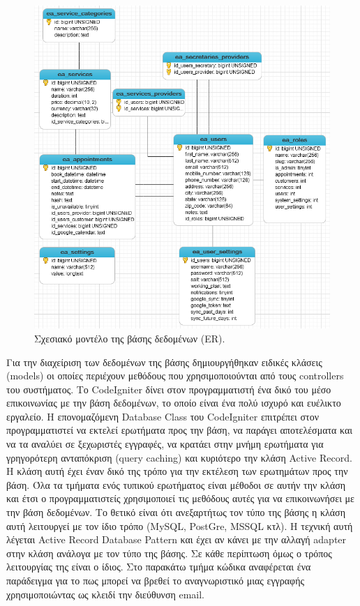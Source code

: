 \begin{figure}[ht!]
\centering
\includegraphics[width=160mm]{images/er.png}
\caption{Σχεσιακό μοντέλο της βάσης δεδομένων (ER).}
\label{er}
\end{figure}

Για την διαχείριση των δεδομένων της βάσης δημιουργήθηκαν ειδικές κλάσεις (models) οι οποίες περιέχουν μεθόδους που χρησιμοποιούνται από τους controllers του συστήματος. Το CodeIgniter δίνει στον προγραμματιστή ένα δικό του μέσο επικοινωνίας με την βάση δεδομένων, το οποίο είναι ένα πολύ ισχυρό και ευέλικτο εργαλείο. Η επονομαζόμενη Database Class του CodeIgniter επιτρέπει στον προγραμματιστεί να εκτελεί ερωτήματα προς την βάση, να παράγει αποτελέσματα και να τα αναλύει σε ξεχωριστές εγγραφές, να κρατάει στην μνήμη ερωτήματα για γρηγορότερη ανταπόκριση (query caching) και κυριότερο την κλάση Active Record. Η κλάση αυτή έχει έναν δικό της τρόπο για την εκτέλεση των ερωτημάτων προς την βάση. Όλα τα τμήματα ενός τυπικού ερωτήματος είναι μέθοδοι σε αυτήν την κλάση και έτσι ο προγραμματιστείς χρησιμοποιεί τις μεθόδους αυτές για να επικοινωνήσει με την βάση δεδομένων. Το θετικό είναι ότι ανεξαρτήτως τον τύπο της βάσης η κλάση αυτή λειτουργεί με τον ίδιο τρόπο (MySQL, PostGre, MSSQL κτλ). Η τεχνική αυτή λέγεται Active Record Database Pattern και έχει αν κάνει με την αλλαγή adapter στην κλάση ανάλογα με τον τύπο της βάσης. Σε κάθε περίπτωση όμως ο τρόπος λειτουργίας της είναι ο ίδιος. Στο παρακάτω τμήμα κώδικα αναφέρεται ένα παράδειγμα για το πως μπορεί να βρεθεί το αναγνωριστικό μιας εγγραφής χρησιμοποιώντας ως κλειδί την διεύθυνση email.

